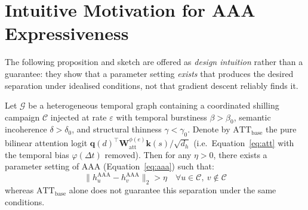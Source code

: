 
\appendix

\section{Intuitive Motivation for AAA Expressiveness}
\label{app:theory}

The following proposition and sketch are offered as \emph{design intuition}
rather than a guarantee: they show that a parameter setting \emph{exists} that
produces the desired separation under idealised conditions, not that gradient
descent reliably finds it.

\begin{proposition}
\label{prop:aaa}
Let $\mathcal{G}$ be a heterogeneous temporal graph containing a coordinated
shilling campaign $\mathcal{C}$ injected at rate $\varepsilon$ with temporal
burstiness $\beta > \beta_0$, semantic incoherence $\delta > \delta_0$, and
structural thinness $\gamma < \gamma_0$.
Denote by $\mathrm{ATT}_{\mathrm{base}}$ the pure bilinear attention logit
$\mathbf{q}(d)^{\!\top}\mathbf{W}_{\mathrm{att}}^{\phi(e)}\mathbf{k}(s)/\sqrt{d_h}$
(i.e.\ Equation~\eqref{eq:att} with the temporal bias $\varphi(\Delta t)$
removed).
Then for any $\eta > 0$, there exists a parameter setting of AAA
(Equation~\eqref{eq:aaa}) such that:
$$\| h_u^{\text{AAA}} - h_v^{\text{AAA}} \|_2 > \eta \quad \forall u \in \mathcal{C},\ v \notin \mathcal{C}$$
whereas $\mathrm{ATT}_{\mathrm{base}}$ alone does not guarantee this separation
under the same conditions.
\end{proposition}

